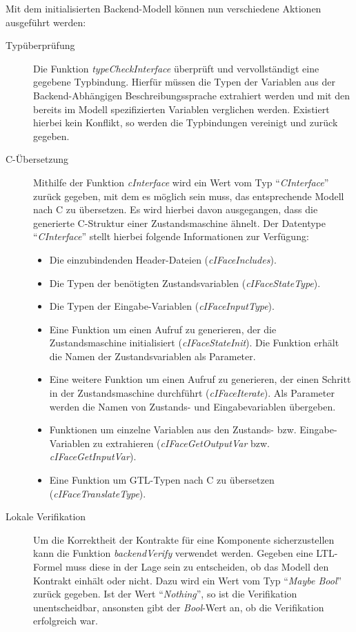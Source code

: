Mit dem initialisierten Backend-Modell können nun verschiedene Aktionen ausgeführt werden:
\begin{description}
\item[Typüberprüfung] Die Funktion \emph{typeCheckInterface} überprüft und vervollständigt eine gegebene Typbindung.
  Hierfür müssen die Typen der Variablen aus der Backend-Abhängigen Beschreibungssprache extrahiert werden und mit den bereits im Modell spezifizierten Variablen verglichen werden.
  Existiert hierbei kein Konflikt, so werden die Typbindungen vereinigt und zurück gegeben.
\item[C-Übersetzung] Mithilfe der Funktion \emph{cInterface} wird ein Wert vom Typ "`\emph{CInterface}"' zurück gegeben, mit dem es möglich sein muss, das entsprechende Modell nach C zu übersetzen.
  Es wird hierbei davon ausgegangen, dass die generierte C-Struktur einer Zustandsmaschine ähnelt.
  Der Datentype "`\emph{CInterface}"' stellt hierbei folgende Informationen zur Verfügung:
  \begin{itemize}
  \item Die einzubindenden Header-Dateien (\emph{cIFaceIncludes}).
  \item Die Typen der benötigten Zustandsvariablen (\emph{cIFaceStateType}).
  \item Die Typen der Eingabe-Variablen (\emph{cIFaceInputType}).
  \item Eine Funktion um einen Aufruf zu generieren, der die Zustandsmaschine initialisiert (\emph{cIFaceStateInit}).
    Die Funktion erhält die Namen der Zustandsvariablen als Parameter.
  \item Eine weitere Funktion um einen Aufruf zu generieren, der einen Schritt in der Zustandsmaschine durchführt (\emph{cIFaceIterate}).
    Als Parameter werden die Namen von Zustands- und Eingabevariablen übergeben.
  \item Funktionen um einzelne Variablen aus den Zustands- bzw. Eingabe-Variablen zu extrahieren (\emph{cIFaceGetOutputVar} bzw. \emph{cIFaceGetInputVar}).
  \item Eine Funktion um GTL-Typen nach C zu übersetzen (\emph{cIFaceTranslateType}).
  \end{itemize}
\item[Lokale Verifikation] Um die Korrektheit der Kontrakte für eine Komponente sicherzustellen kann die Funktion \emph{backendVerify} verwendet werden.
  Gegeben eine LTL-Formel muss diese in der Lage sein zu entscheiden, ob das Modell den Kontrakt einhält oder nicht.
  Dazu wird ein Wert vom Typ "`\emph{Maybe Bool}"' zurück gegeben.
  Ist der Wert "`\emph{Nothing}"', so ist die Verifikation unentscheidbar, ansonsten gibt der \emph{Bool}-Wert an, ob die Verifikation erfolgreich war.
\end{description}
